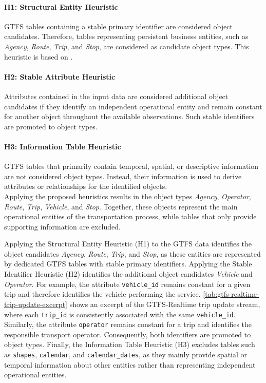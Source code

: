 \paragraph{H1: Structural Entity Heuristic}
GTFS tables containing a stable primary identifier are considered object candidates.  Therefore, tables representing persistent business entities, such as \textit{Agency}, \textit{Route}, \textit{Trip}, and \textit{Stop}, are considered as candidate object types. This heuristic is based on \cite{ExtractingOCEL}.

\paragraph{H2: Stable Attribute Heuristic}
Attributes contained in the input data are considered additional object candidates if they identify an independent operational entity and remain constant for another object throughout the available observations. Such stable identifiers are promoted to object types.

\paragraph{H3: Information Table Heuristic}
GTFS tables that primarily contain temporal, spatial, or descriptive information are not considered object types. Instead, their information is used to derive attributes or relationships for the identified objects.
\\


Applying the proposed heuristics results in the object types \textit{Agency}, \textit{Operator}, \textit{Route}, \textit{Trip}, \textit{Vehicle}, and \textit{Stop}. Together, these objects represent the main operational entities of the transportation process, while tables that only provide supporting information are excluded.

Applying the Structural Entity Heuristic (H1) to the GTFS data identifies the object candidates \textit{Agency}, \textit{Route}, \textit{Trip}, and \textit{Stop}, as these entities are represented by dedicated GTFS tables with stable primary identifiers. Applying the Stable Identifier Heuristic (H2) identifies the additional object candidates \textit{Vehicle} and \textit{Operator}. For example, the attribute \texttt{vehicle\_id} remains constant for a given trip and therefore identifies the vehicle performing the service. \autoref{tab:gtfs-realtime-trip-update-excerpt} shows an excerpt of the GTFS-Realtime trip update stream, where each \texttt{trip\_id} is consistently associated with the same \texttt{vehicle\_id}. Similarly, the attribute \texttt{operator} remains constant for a trip and identifies the responsible transport operator. Consequently, both identifiers are promoted to object types. Finally, the Information Table Heuristic (H3) excludes tables such as \texttt{shapes}, \texttt{calendar}, and \texttt{calendar\_dates}, as they mainly provide spatial or temporal information about other entities rather than representing independent operational entities.

